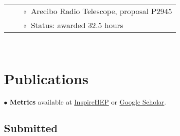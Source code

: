 \documentclass[11pt,letterpaper,sans,unicode]{moderncv}
\begin{document}
\begin{tabular}{rcl}
&\hspace{0.4cm} &{\color{color1} $\circ\;\;$}Arecibo Radio Telescope, proposal P$2945$ \\
&\hspace{0.4cm} &{\color{color1} $\circ\;\;$}Status: awarded $32.5$ hours
\end{tabular} \\


\section{Publications}



$\bullet$ \textbf{Metrics} available at {\color{color1} \href{https://inspirehep.net/literature?sort=mostrecent&size=25&page=1&q=a%20J.S.Hazboun.1&ui-citation-summary=true}{InspireHEP} or \href{https://scholar.google.com/citations?user=CbNY_MYAAAAJ&hl=en}{Google Scholar}}.

\subsection{Submitted}

\begin{etaremune}[leftmargin=8mm]

\end{etaremune}

\end{document}
